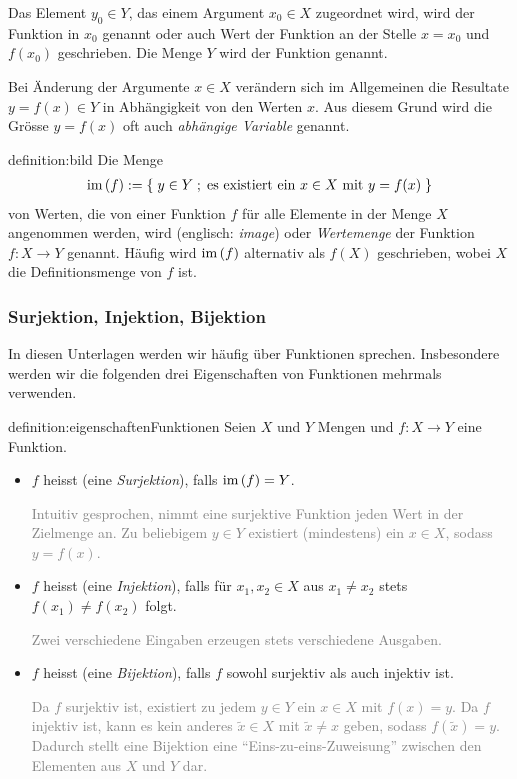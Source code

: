 Das Element $y_0\in Y$, das einem Argument $x_0\in X$ zugeordnet wird, wird  der Funktion in $x_0$ genannt oder auch Wert der Funktion an der Stelle $x = x_0$ und $f(x_0)$ geschrieben. Die Menge $Y$ wird  der Funktion genannt.

Bei Änderung der Argumente $x\in X$ verändern sich im Allgemeinen die Resultate $y = f(x)\in Y$ in Abhängigkeit von den Werten $x$. Aus diesem Grund wird die Grösse $y=f(x)$ oft auch \textit{abhängige Variable} genannt.
\begin{definition}{definition:bild}
Die Menge
\begin{align*}
    \text{im}\left(f\right) := \left\{\;y\in Y \; ; \; \text{es existiert ein $x\in X$ mit $y=f(x)$} \;\right\}
\end{align*}
von Werten, die von einer Funktion $f$ für alle Elemente in der Menge $X$ angenommen werden, wird  (englisch: \textit{image}) oder \textit{Wertemenge} der Funktion $f:X\to Y$ genannt. Häufig wird $\text{im}\left(f\right)$ alternativ als $f(X)$ geschrieben, wobei $X$ die Definitionsmenge von $f$ ist.
\end{definition}

\subsubsection{Surjektion, Injektion, Bijektion}
In diesen Unterlagen werden wir häufig über Funktionen sprechen. Insbesondere werden wir die folgenden drei Eigenschaften von Funktionen mehrmals verwenden.
\begin{definition}{definition:eigenschaftenFunktionen}
Seien $X$ und $Y$ Mengen und $f: X\to Y$ eine Funktion.
\begin{itemize}
    \item $f$ heisst  (eine \textit{Surjektion}), falls $\text{im}\left(f\right) = Y$.
    
    \textcolor{Gray}{Intuitiv gesprochen, nimmt eine surjektive Funktion jeden Wert in der Zielmenge an. Zu beliebigem $y\in Y$ existiert (mindestens) ein $x\in X$, sodass $y=f(x)$.}
    \item $f$ heisst  (eine \textit{Injektion}), falls für $x_1,x_2\in X$ aus $x_1\neq x_2$ stets $f(x_1)\neq f(x_2)$ folgt.
    
    \textcolor{Gray}{Zwei verschiedene Eingaben erzeugen stets verschiedene Ausgaben.}
    \item $f$ heisst  (eine \textit{Bijektion}), falls $f$ sowohl surjektiv als auch injektiv ist.
    
    \textcolor{Gray}{Da $f$ surjektiv ist, existiert zu jedem $y\in Y$ ein $x\in X$ mit $f(x)=y$. Da $f$ injektiv ist, kann es kein anderes $\tilde{x}\in X$ mit $\tilde{x}\neq x$ geben, sodass $f(\tilde{x})=y$. Dadurch stellt eine Bijektion eine \enquote{Eins-zu-eins-Zuweisung} zwischen den Elementen aus $X$ und $Y$ dar.}
\end{itemize}
\end{definition}

